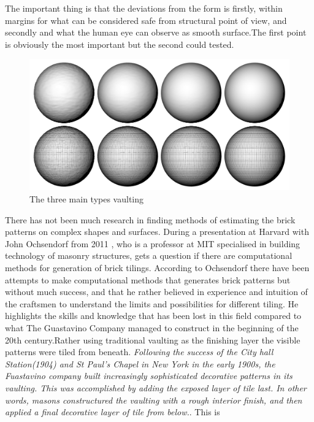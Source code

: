 The important thing is that the deviations from the form  is firstly, within margins for what can be considered safe from structural point of view, and secondly and what the human eye can observe as smooth surface.The first point is obviously the most important but the second could tested.  

\begin{figure}[H]
\centering
\includegraphics[width=1.0\linewidth ]{figure/Introduction/meshdistort2.JPG}
\caption{The three main types vaulting}
\end{figure}



There has not been much research in finding methods of estimating the brick patterns on complex shapes and surfaces. During a presentation at Harvard with John Ochsendorf from 2011 \cite{ref:interview}, who is a professor at MIT specialised in building technology of masonry structures, gets a question if there are computational methods for generation of brick tilings. According to Ochsendorf there have been attempts to make computational methods that generates brick patterns but without much success, and that he rather believed in experience and intuition of the craftsmen to understand the limits and possibilities for different tiling. He highlights the skills and knowledge that has been lost in this field compared to what The Guastavino Company managed to construct in the beginning of the 20th century.Rather using traditional vaulting as the finishing layer the visible patterns were tiled from beneath. \textit{Following the success of the City hall Station(1904) and St Paul's Chapel in New York in the early 1900s, the Fuastavino company built increasingly sophisticated decorative patterns in its vaulting. This was accomplished by adding the exposed layer of tile last. In other words, masons constructured the vaulting with a rough interior finish, and then applied a final decorative  layer of tile from below.}\cite{ref:Ochsendorf}. This is





